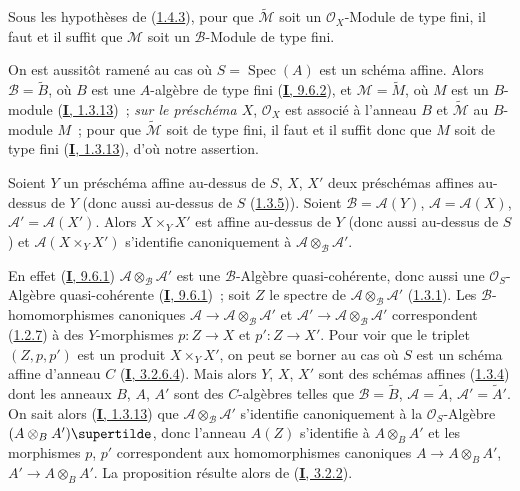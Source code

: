 \begin{corollary}[1.4.5]
\label{II.1.4.5-fr}
Sous les hypothèses de \textup{(\hyperref[II.1.4.3-fr]{1.4.3})}, pour que
$\widetilde{\mathcal{M}}$ soit un $\mathcal{O}_X$-Module de type fini, il faut
et il suffit que $\mathcal{M}$ soit un $\mathcal{B}$-Module de type fini.
\end{corollary}

On est aussitôt ramené au cas où $S=\operatorname{Spec}(A)$ est un schéma
affine. Alors $\mathcal{B}=\widetilde{B}$, où $B$ est une $A$-algèbre de type
fini (\hyperref[I.9.6.2-fr]{\textbf{I}, 9.6.2}), et
$\mathcal{M}=\widetilde{M}$, où $M$ est un $B$-module
(\hyperref[I.1.3.13-fr]{\textbf{I}, 1.3.13})~; \emph{sur le préschéma $X$},
$\mathcal{O}_X$ est associé à l'anneau $B$ et
$\widetilde{\mathcal{M}}$ au $B$-module $M$~; pour que
$\widetilde{\mathcal{M}}$ soit de type fini, il faut et il suffit donc que
$M$ soit de type fini (\hyperref[I.1.3.13-fr]{\textbf{I}, 1.3.13}), d'où notre
assertion.

\begin{proposition}[1.4.6]
\label{II.1.4.6-fr}
Soient $Y$ un préschéma affine au-dessus de $S$, $X$, $X'$ deux préschémas
affines au-dessus de $Y$ \textup{(donc aussi au-dessus de $S$
(\hyperref[II.1.3.5-fr]{1.3.5}))}. Soient
$\mathcal{B}=\mathcal{A}(Y)$, $\mathcal{A}=\mathcal{A}(X)$,
$\mathcal{A}'=\mathcal{A}(X')$. Alors $X\times_Y X'$ est affine au-dessus de
$Y$ \textup{(donc aussi au-dessus de $S$)} et $\mathcal{A}(X\times_Y X')$
s'identifie canoniquement à $\mathcal{A}\otimes_{\mathcal{B}}\mathcal{A}'$.
\end{proposition}

En effet (\hyperref[I.9.6.1-fr]{\textbf{I}, 9.6.1})
$\mathcal{A}\otimes_{\mathcal{B}}\mathcal{A}'$ est une
$\mathcal{B}$-Algèbre quasi-cohérente, donc aussi une
$\mathcal{O}_S$-Algèbre quasi-cohérente
(\hyperref[I.9.6.1-fr]{\textbf{I}, 9.6.1})~; soit $Z$ le spectre de
$\mathcal{A}\otimes_{\mathcal{B}}\mathcal{A}'$
(\hyperref[II.1.3.1-fr]{1.3.1}). Les $\mathcal{B}$-homomorphismes canoniques
$\mathcal{A}\to\mathcal{A}\otimes_{\mathcal{B}}\mathcal{A}'$ et
$\mathcal{A}'\to\mathcal{A}\otimes_{\mathcal{B}}\mathcal{A}'$ correspondent
(\hyperref[II.1.2.7-fr]{1.2.7}) à des $Y$-morphismes $p:Z\to X$ et
$p':Z\to X'$. Pour voir que le triplet $(Z,p,p')$ est un produit
$X\times_Y X'$, on peut se borner au cas où $S$ est un schéma affine
d'anneau $C$ (\hyperref[I.3.2.6.4-fr]{\textbf{I}, 3.2.6.4}). Mais alors $Y$, $X$,
$X'$ sont des schémas affines (\hyperref[II.1.3.4-fr]{1.3.4}) dont les
anneaux $B$, $A$, $A'$ sont des $C$-algèbres telles que
$\mathcal{B}=\widetilde{B}$, $\mathcal{A}=\widetilde{A}$,
$\mathcal{A}'=\widetilde{A}'$. On sait alors
(\hyperref[I.1.3.13-fr]{\textbf{I}, 1.3.13}) que
$\mathcal{A}\otimes_{\mathcal{B}}\mathcal{A}'$ s'identifie canoniquement à
la $\mathcal{O}_S$-Algèbre $(A\otimes_B A')\supertilde$, donc l'anneau
$A(Z)$ s'identifie à $A\otimes_B A'$ et les morphismes $p$, $p'$ correspondent
aux homomorphismes canoniques $A\to A\otimes_B A'$,
$A'\to A\otimes_B A'$. La proposition résulte alors de
(\hyperref[I.3.2.2-fr]{\textbf{I}, 3.2.2}).

